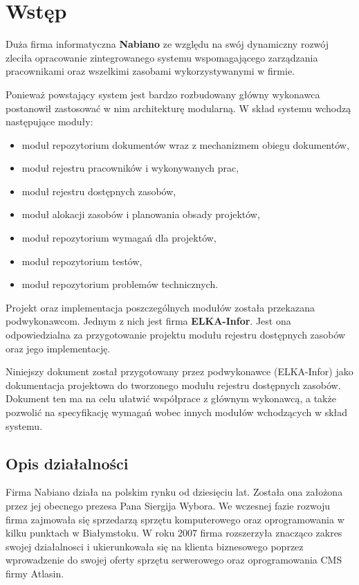 \section{Wstęp}

Duża firma informatyczna {\bf Nabiano} ze względu na swój dynamiczny
rozwój zleciła opracowanie zintegrowanego systemu wspomagającego
zarządzania pracownikami oraz wszelkimi zasobami wykorzystywanymi w
firmie.

Ponieważ powstający system jest bardzo rozbudowany główny wykonawca
postanowił zastosować w nim architekturę modularną. W skład systemu
wchodzą następujące moduły:

\begin{itemize}
\item moduł repozytorium dokumentów wraz z mechanizmem obiegu dokumentów,
\item moduł rejestru pracowników i wykonywanych prac,
\item moduł rejestru dostępnych zasobów,
\item moduł alokacji zasobów i planowania obsady projektów,
\item moduł repozytorium wymagań dla projektów,
\item moduł repozytorium testów,
\item moduł repozytorium problemów technicznych.
\end{itemize}

Projekt oraz implementacja poszczególnych modułów została przekazana
podwykonawcom. Jednym z nich jest firma {\bf ELKA-Infor}. Jest ona
odpowiedzialna za przygotowanie projektu modułu rejestru dostępnych
zasobów oraz jego implementację.

Niniejszy dokument został przygotowany przez podwykonawce (ELKA-Infor)
jako dokumentacja projektowa do tworzonego modułu rejestru dostępnych
zasobów. Dokument ten ma na celu ułatwić współprace z głównym
wykonawcą, a także pozwolić na specyfikację wymagań wobec innych
modułów wchodzących w skład systemu.

\subsection{Opis działalności}

Firma Nabiano działa na polskim rynku od dziesięciu lat. Została ona
założona przez jej obecnego prezesa Pana Siergija Wybora. We wczesnej
fazie rozwoju firma zajmowała się sprzedarzą sprzętu komputerowego
oraz oprogramowania w kilku punktach w Białymstoku. W roku 2007 firma
rozszerzyła znacząco zakres swojej działalnosci i ukierunkowała się na
klienta biznesowego poprzez wprowadzenie do swojej oferty sprzętu
serwerowego oraz oprogramowania CMS firmy Atlasin.

